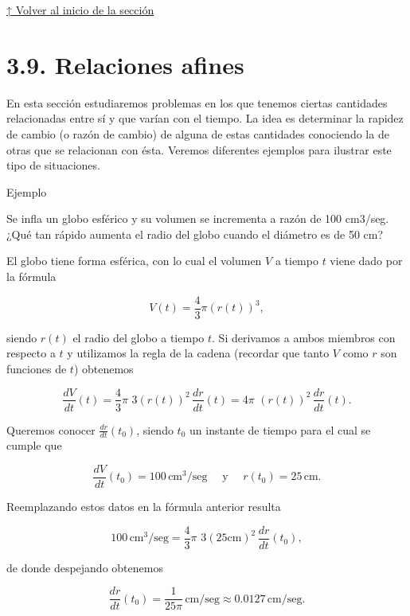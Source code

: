 \documentclass[
  letterpaper,
]{book}
\theoremstyle{plain}
\theoremstyle{remark}
\begin{document}
\hyperref[seccion_3.7]{↑ Volver al inicio de la sección}

\section{3.9. Relaciones afines}\label{seccion_3.9}

En esta sección estudiaremos problemas en los que tenemos ciertas
cantidades relacionadas entre sí y que varían con el tiempo. La idea es
determinar la rapidez de cambio (o razón de cambio) de alguna de estas
cantidades conociendo la de otras que se relacionan con ésta. Veremos
diferentes ejemplos para ilustrar este tipo de situaciones.

Ejemplo

Se infla un globo esférico y su volumen se incrementa a razón de 100
cm3/seg. ¿Qué tan rápido aumenta el radio del globo cuando el diámetro
es de 50 cm?

\begin{tcolorbox}[enhanced jigsaw, opacityback=0, left=2mm, opacitybacktitle=0.6, toprule=.15mm, bottomrule=.15mm, colbacktitle=quarto-callout-tip-color!10!white, titlerule=0mm, bottomtitle=1mm, title=\textcolor{quarto-callout-tip-color}{\faLightbulb}\hspace{0.5em}{Solución}, toptitle=1mm, colframe=quarto-callout-tip-color-frame, colback=white, breakable, rightrule=.15mm, arc=.35mm, leftrule=.75mm, coltitle=black]

El globo tiene forma esférica, con lo cual el volumen \(V\) a tiempo
\(t\) viene dado por la fórmula

\[
V(t)=\frac{4}{3}\pi (r(t))^3,
\]

siendo \(r(t)\) el radio del globo a tiempo \(t\). Si derivamos a ambos
miembros con respecto a \(t\) y utilizamos la regla de la cadena
(recordar que tanto \(V\) como \(r\) son funciones de \(t\)) obtenemos

\[
\frac{dV}{dt}(t)=\frac{4}{3}\pi\,\, 3(r(t))^2\,\frac{dr}{dt}(t)=4\pi\,\, (r(t))^2\,\frac{dr}{dt}(t).
\]

Queremos conocer \(\displaystyle \frac{dr}{dt}(t_0)\), siendo \(t_0\) un
instante de tiempo para el cual se cumple que

\[
\frac{dV}{dt}(t_0)=100\, \mathrm{cm^3/seg} \quad \text{ y } \quad r(t_0)=25\, \mathrm{cm}.
\]

Reemplazando estos datos en la fórmula anterior resulta

\[
100\, \mathrm{cm^3/seg}=\frac{4}{3}\pi\,\, 3(25 \mathrm{cm})^2\,\frac{dr}{dt}(t_0),
\]

de donde despejando obtenemos

\[
\frac{dr}{dt}(t_0)=\frac{1}{25 \pi}\, \mathrm{cm/seg} \approx 0.0127\, \mathrm{cm/seg}.
\]

\end{tcolorbox}
\end{document}
